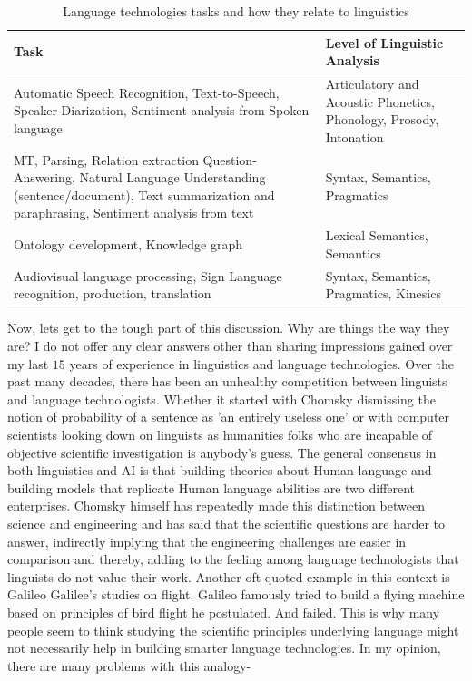 \documentclass{article}
\begin{document}
\begin{table}[h!]
\centering
\begin{tabular}{|p{}|p{}|} 
 \hline
 Task & Level of Linguistic Analysis \\ 
 \hline\hline
 Automatic Speech Recognition, Text-to-Speech, Speaker Diarization, Sentiment analysis from Spoken language & Articulatory and Acoustic Phonetics, Phonology, Prosody, Intonation \\ \hline
 MT, Parsing, Relation extraction Question-Answering, Natural Language Understanding (sentence/document), Text summarization and paraphrasing, Sentiment analysis from text & Syntax, Semantics, Pragmatics \\ \hline
 Ontology development, Knowledge graph & Lexical Semantics, Semantics \\ \hline 
 Audiovisual language processing, Sign Language recognition, production, translation & Syntax, Semantics, Pragmatics, Kinesics  \\
 \hline
\end{tabular}
\caption{Language technologies tasks and how they relate to linguistics}
\label{table:taskslevels}
\end{table}
Now, lets get to the tough part of this discussion. Why are things the way they are? I do not offer any clear answers other than sharing impressions gained over my last $15$ years of experience in linguistics and language technologies. Over the past many decades, there has been an unhealthy competition between linguists and language technologists. Whether it started with Chomsky dismissing the notion of probability of a sentence as 'an entirely useless one' or with computer scientists looking down on linguists as humanities folks who are incapable of objective scientific investigation is anybody's guess. The general consensus in both linguistics and AI is that building theories about Human language and building models that replicate Human language abilities are two different enterprises. Chomsky himself has repeatedly made this distinction between science and engineering and has said that the scientific questions are harder to answer, indirectly implying that the engineering challenges are easier in comparison and thereby, adding to the feeling among language technologists that linguists do not value their work. Another oft-quoted example in this context is Galileo Galilee's studies on flight. Galileo famously tried to build a flying machine based on principles of bird flight he postulated. And failed. This is why many people seem to think studying the scientific principles underlying language might not necessarily help in building smarter language technologies. In my opinion, there are many problems with this analogy- 
\end{document}
